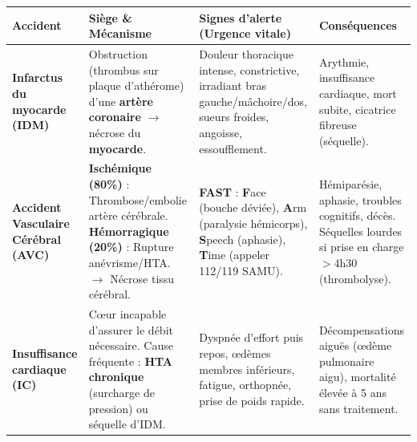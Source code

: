 \documentclass[11pt]{article}
\begin{document}
\begin{propriete}
\begin{center}
\begin{tabularx}{\linewidth}{|l|X|X|X|}
\hline
\rowcolor{popblueL} \textbf{Accident} & \textbf{Siège \& Mécanisme} & \textbf{Signes d'alerte (Urgence vitale)} & \textbf{Conséquences} \\
\hline
\textbf{Infarctus du myocarde (IDM)} & Obstruction (thrombus sur plaque d'athérome) d'une \textbf{artère coronaire} $\rightarrow$ nécrose du \textbf{myocarde}. & Douleur thoracique intense, constrictive, irradiant bras gauche/mâchoire/dos, sueurs froides, angoisse, essoufflement. & Arythmie, insuffisance cardiaque, mort subite, cicatrice fibreuse (séquelle). \\
\hline
\textbf{Accident Vasculaire Cérébral (AVC)} & \textbf{Ischémique (80\%)} : Thrombose/embolie artère cérébrale. \textbf{Hémorragique (20\%)} : Rupture anévrisme/HTA. $\rightarrow$ Nécrose tissu cérébral. & \textbf{FAST} : \textbf{F}ace (bouche déviée), \textbf{A}rm (paralysie hémicorps), \textbf{S}peech (aphasie), \textbf{T}ime (appeler 112/119 SAMU). & Hémiparésie, aphasie, troubles cognitifs, décès. Séquelles lourdes si prise en charge $> 4$h30 (thrombolyse). \\
\hline
\textbf{Insuffisance cardiaque (IC)} & Cœur incapable d'assurer le débit nécessaire. Cause fréquente : \textbf{HTA chronique} (surcharge de pression) ou séquelle d'IDM. & Dyspnée d'effort puis repos, œdèmes membres inférieurs, fatigue, orthopnée, prise de poids rapide. & Décompensations aiguës (œdème pulmonaire aigu), mortalité élevée à 5 ans sans traitement. \\
\hline
\end{tabularx}
\end{center}
\end{propriete}
\end{document}
